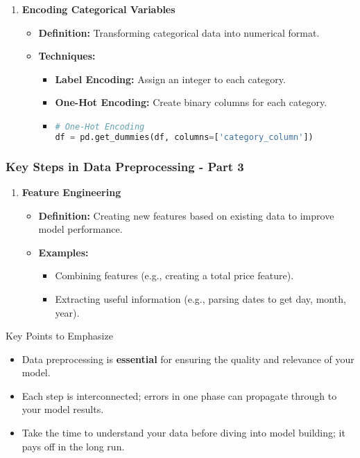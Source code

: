 \documentclass[aspectratio=169]{beamer}
\begin{document}
\begin{frame}
\begin{enumerate}[start=2]
        \item \textbf{Encoding Categorical Variables}
        \begin{itemize}
            \item \textbf{Definition:} Transforming categorical data into numerical format.
            \item \textbf{Techniques:}
            \begin{itemize}
                \item \textbf{Label Encoding:} Assign an integer to each category.
                \item \textbf{One-Hot Encoding:} Create binary columns for each category.
                \item \begin{lstlisting}[language=Python]
# One-Hot Encoding
df = pd.get_dummies(df, columns=['category_column'])
                \end{lstlisting}
            \end{itemize}
        \end{itemize}
    \end{enumerate}
\end{frame}

\begin{frame}
    \frametitle{Key Steps in Data Preprocessing - Part 3}
    \begin{enumerate}[start=4]
        \item \textbf{Feature Engineering}
        \begin{itemize}
            \item \textbf{Definition:} Creating new features based on existing data to improve model performance.
            \item \textbf{Examples:}
            \begin{itemize}
                \item Combining features (e.g., creating a total price feature).
                \item Extracting useful information (e.g., parsing dates to get day, month, year).
            \end{itemize}
        \end{itemize}
    \end{enumerate}

    \begin{block}{Key Points to Emphasize}
        \begin{itemize}
            \item Data preprocessing is \textbf{essential} for ensuring the quality and relevance of your model.
            \item Each step is interconnected; errors in one phase can propagate through to your model results.
            \item Take the time to understand your data before diving into model building; it pays off in the long run.
        \end{itemize}
    \end{block}
\end{frame}
\end{document}
